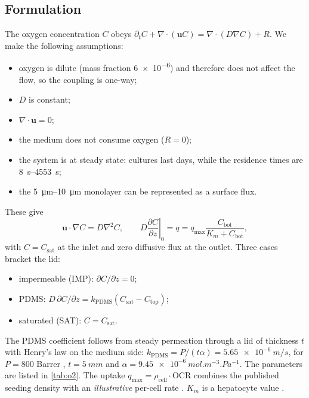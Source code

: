 \documentclass[11pt,a4paper]{article}
\newcommand{\Csat}{C_{\mathrm{sat}}}
\newcommand{\Cbot}{C_{\mathrm{bot}}}
\newcommand{\Ctop}{C_{\mathrm{top}}}
\newcommand{\qmax}{q_{\max}}
\newcommand{\Km}{K_{m}}
\newcommand{\kp}{k_{\mathrm{PDMS}}}
\begin{document}
\subsection{Formulation}

The oxygen concentration $C$ obeys $\partial_tC+\nabla\cdot(\bm uC)=\nabla\cdot(D\nabla C)+R$. We make the following assumptions:
\begin{itemize}
\item oxygen is dilute (mass fraction \num{6e-6}) and therefore does not affect the flow, so the coupling is one-way;
\item $D$ is constant;
\item $\nabla\cdot\bm u=0$;
\item the medium does not consume oxygen ($R=0$);
\item the system is at steady state: cultures last days, while the residence times are \SIrange{8}{4553}{s};
\item the \SIrange{5}{10}{\micro\metre} monolayer can be represented as a surface flux.
\end{itemize}
These give
\begin{equation}
\bm u\cdot\nabla C=D\nabla^2C,
\qquad D\left.\frac{\partial C}{\partial z}\right|_{0}=q=\qmax\frac{\Cbot}{\Km+\Cbot},
\label{eq:o2}
\end{equation}
with $C=\Csat$ at the inlet and zero diffusive flux at the outlet. Three cases bracket the lid:
\begin{itemize}
\item impermeable (IMP): $\partial C/\partial z=0$;
\item PDMS: $D\,\partial C/\partial z=\kp(\Csat-\Ctop)$;
\item saturated (SAT): $C=\Csat$.
\end{itemize}
The PDMS coefficient follows from steady permeation through a lid of thickness $t$ with Henry's law on the medium side: $\kp=P/(t\alpha)=\SI{5.65e-6}{m/s}$, for $P=800$ Barrer \citep{Merkel2000}, $t=\SI{5}{mm}$ and $\alpha=\SI{9.45e-6}{mol.m^{-3}.Pa^{-1}}$. The parameters are listed in \cref{tab:o2}. The uptake $\qmax=\rho_{\mathrm{cell}}\cdot\mathrm{OCR}$ combines the published seeding density with an \emph{illustrative} per-cell rate \citep{Wagner2011}. $\Km$ is a hepatocyte value \citep{Rotem1994}.
\end{document}
